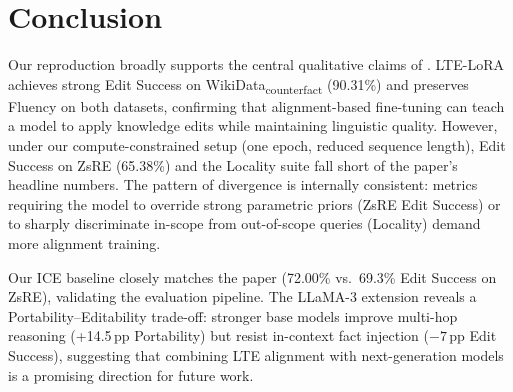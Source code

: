 \documentclass[11pt,a4paper,twocolumn]{article}
\begin{document}
\section*{Conclusion}

Our reproduction broadly supports the central qualitative claims of \citet{jiang2024learning}. LTE-LoRA achieves strong Edit Success on WikiData\textsubscript{counterfact} (90.31\%) and preserves Fluency on both datasets, confirming that alignment-based fine-tuning can teach a model to apply knowledge edits while maintaining linguistic quality. However, under our compute-constrained setup (one epoch, reduced sequence length), Edit Success on ZsRE (65.38\%) and the Locality suite fall short of the paper's headline numbers. The pattern of divergence is internally consistent: metrics requiring the model to override strong parametric priors (ZsRE Edit Success) or to sharply discriminate in-scope from out-of-scope queries (Locality) demand more alignment training.

Our ICE baseline closely matches the paper (72.00\% vs.\ 69.3\% Edit Success on ZsRE), validating the evaluation pipeline. The LLaMA-3 extension reveals a Portability--Editability trade-off: stronger base models improve multi-hop reasoning (+14.5\,pp Portability) but resist in-context fact injection ($-7$\,pp Edit Success), suggesting that combining LTE alignment with next-generation models is a promising direction for future work.


\end{document}
